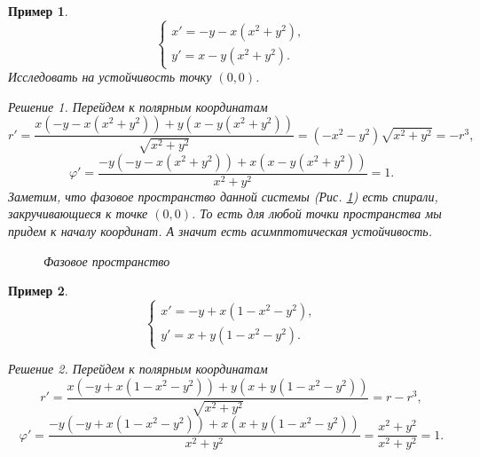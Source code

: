 \documentclass[a5paper, 11pt]{article}
\theoremstyle{definition}
\theoremstyle{plain}
\newtheorem{Ex}{Пример}
\theoremstyle{remark}
\newtheorem*{Solution}{Решение}
\begin{document}
	\begin{Ex}
		\[
		\begin{cases}
			x' = -y-x(x^2+y^2),\\
			y' = x-y(x^2+y^2).
		\end{cases}
		\]
		Исследовать на устойчивость точку $(0,0)$.
		\begin{Solution}
			Перейдем к полярным координатам
			\[
			r' = \frac{x (-y-x(x^2+y^2)) + y (x-y(x^2+y^2))}{\sqrt{x^2+y^2}} = (-x^2-y^2)\sqrt{x^2+y^2} = -r^3,
			\]
			\[
			\varphi' = \frac{-y (-y-x(x^2+y^2)) + x (x-y(x^2+y^2))}{x^2+y^2} = 1.
			\]
			Заметим, что фазовое пространство данной системы (Рис. \ref{spiral}) есть спирали, закручивающиеся к точке $(0,0)$. То есть для любой точки пространства мы придем к началу координат. А значит есть асимптотическая устойчивость.
			\begin{figure}[h!]
				\centering
			\caption{Фазовое пространство} \label{spiral}
			\end{figure}
		\end{Solution}
	\end{Ex}

	\begin{Ex}
		\[
		\begin{cases}
			x' = -y + x(1-x^2-y^2),\\
			y' = x + y(1-x^2-y^2).
		\end{cases}
		\]
		\begin{Solution}
			Перейдем к полярным координатам
			\[
			r' = \frac{x(-y + x(1-x^2-y^2))+y(x + y(1-x^2-y^2))}{\sqrt{x^2+y^2}} = r-r^3,
			\]
			\[
			\varphi' = \frac{-y(-y + x(1-x^2-y^2))+x(x + y(1-x^2-y^2))}{x^2+y^2} = \frac{x^2+y^2}{x^2+y^2} = 1.
			\]
	
	
		\end{Solution}
	\end{Ex}
	
\end{document}

